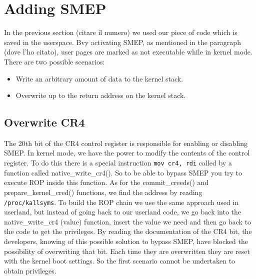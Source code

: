 \documentclass{masterthesis}
\begin{document}
\section{Adding SMEP}
In the previous section (citare il numero) we used our piece of code which is saved in the userspace. Bvy activating SMEP, as mentioned in the paragraph (dove l'ho citato), user pages are marked as not executable while in kernel mode.
There are two possible scenarios:
\begin{itemize}
\item Write an arbitrary amount of data to the kernel stack.
\item Overwrite up to the return address on the kernel stack.
\end{itemize}
\subsection{Overwrite CR4}
\label{subsect:CR4}
The 20th bit of the CR4 control register is responsible for enabling or disabling SMEP.
In kernel mode, we have the power to modify the contents of the control register.
To do this there is a special instruction \lstinline{mov cr4, rdi} called by a function called native_write_cr4().
So to be able to bypass SMEP you try to execute ROP inside this function.
As for the commit_creeds() and prepare_kernel_cred() functions, we find the address by reading \lstinline{/proc/kallsyms}.
To build the ROP chain we use the same approach used in userland, but instead of going back to our userland code, we go back into the native_write_cr4 (value) function, insert the value we need and then go back to the code to get the privileges.
By reading the documentation of the CR4 bit, the developers, knowing of this possible solution to bypass SMEP, have blocked the possibility of overwriting that bit.
Each time they are overwritten they are reset with the kernel boot settings.
So the first scenario cannot be undertaken to obtain privileges.
\end{document}
